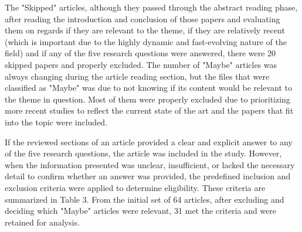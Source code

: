 The "Skipped" articles, although they passed through the abstract reading phase, after reading the introduction and conclusion of those papers and evaluating them on regards if they are relevant to the theme, if they are relatively recent (which is important due to the highly dynamic and fast-evolving nature of the field) and if any of the five research questions were answered, there were 20 skipped papers and properly excluded. The number of "Maybe" articles was always changing during the article reading section, but the files that were classified as "Maybe" was due to not knowing if its content would be relevant to the theme in question. Most of them were properly excluded due to prioritizing more recent studies to reflect the current state of the art and the papers that fit into the topic were included.

If the reviewed sections of an article provided a clear and explicit answer to any of the five research questions, the article was included in the study. However, when the information presented was unclear, insufficient, or lacked the necessary detail to confirm whether an answer was provided, the predefined inclusion and exclusion criteria were applied to determine eligibility. These criteria are summarized in Table 3. From the initial set of 64 articles, after excluding and deciding which "Maybe" articles were relevant, 31 met the criteria and were retained for analysis.


